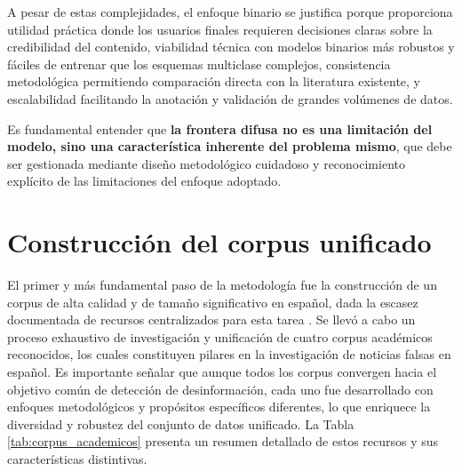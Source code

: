 A pesar de estas complejidades, el enfoque binario se justifica porque proporciona utilidad práctica donde los usuarios finales requieren decisiones claras sobre la credibilidad del contenido, viabilidad técnica con modelos binarios más robustos y fáciles de entrenar que los esquemas multiclase complejos, consistencia metodológica permitiendo comparación directa con la literatura existente, y escalabilidad facilitando la anotación y validación de grandes volúmenes de datos.

Es fundamental entender que \textbf{la frontera difusa no es una limitación del modelo, sino una característica inherente del problema mismo}, que debe ser gestionada mediante diseño metodológico cuidadoso y reconocimiento explícito de las limitaciones del enfoque adoptado.

\section{Construcción del corpus unificado}
\label{sec:construccion_corpus}

El primer y más fundamental paso de la metodología fue la construcción de un corpus de alta calidad y de tamaño significativo en español, dada la escasez documentada de recursos centralizados para esta tarea \cite{hu2022deep}. Se llevó a cabo un proceso exhaustivo de investigación y unificación de cuatro corpus académicos reconocidos, los cuales constituyen pilares en la investigación de noticias falsas en español. Es importante señalar que aunque todos los corpus convergen hacia el objetivo común de detección de desinformación, cada uno fue desarrollado con enfoques metodológicos y propósitos específicos diferentes, lo que enriquece la diversidad y robustez del conjunto de datos unificado. La Tabla \ref{tab:corpus_academicos} presenta un resumen detallado de estos recursos y sus características distintivas.

